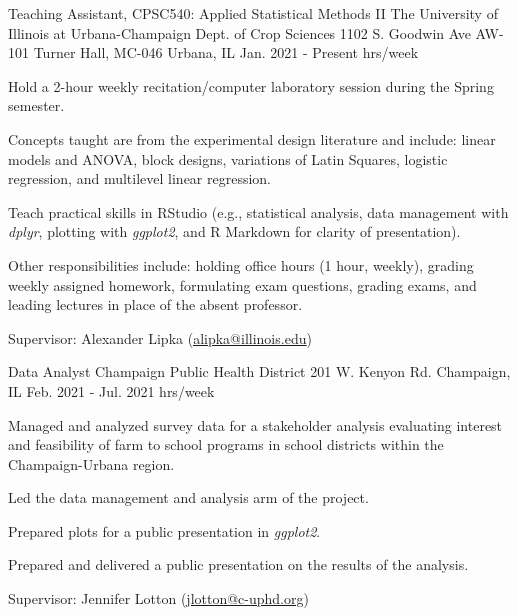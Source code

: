 \begin{cventries}
  \cventry
    {Teaching Assistant, CPSC540: Applied Statistical Methods II} %
    {The University of Illinois at Urbana-Champaign \newline Dept. of Crop Sciences } %
    {1102 S. Goodwin Ave \newline AW-101 Turner Hall, MC-046 \newline
    Urbana, IL} %
    {Jan. 2021 - Present  hrs/week} %
    {
      \begin{cvitems} %
        \item {Hold a 2-hour weekly recitation/computer laboratory session during the Spring semester. }
        \item{Concepts taught are from the experimental design literature and include: linear models and ANOVA, block designs, variations of Latin Squares, logistic regression, and multilevel linear regression.}
        \item{Teach practical skills in RStudio (e.g., statistical analysis, data management with \textit{dplyr}, plotting with \textit{ggplot2}, and R Markdown for clarity of presentation).}
        \item {Other responsibilities include: holding office hours (1 hour, weekly), grading weekly assigned homework, formulating exam questions, grading exams, and leading lectures in place of the absent professor.}
        \item {Supervisor: Alexander Lipka (\textcolor{navyblue}{\underline{\href{mailto:alipka@illinois.edu}{alipka@illinois.edu}}})}
      \end{cvitems}
    }


  \cventry
    {Data Analyst}%
    {Champaign Public Health District } %
    {201 W. Kenyon Rd. \newline
    Champaign, IL} %
    {Feb. 2021 - Jul. 2021  hrs/week} %
    {
      \begin{cvitems} %
        \item {Managed and analyzed survey data for a stakeholder analysis evaluating interest and feasibility of farm to school programs in school districts within the Champaign-Urbana region.}
        \item{Led the data management and analysis arm of the project.}
        \item{Prepared plots for a public presentation in \textit{ggplot2}.}
        \item{Prepared and delivered a public presentation on the results of the analysis.}
        \item {Supervisor: Jennifer Lotton (\textcolor{navyblue}{\underline{\href{mailto:jlotton@c-uphd.org}{jlotton@c-uphd.org}}})}
      \end{cvitems}
    }


\end{cventries}
